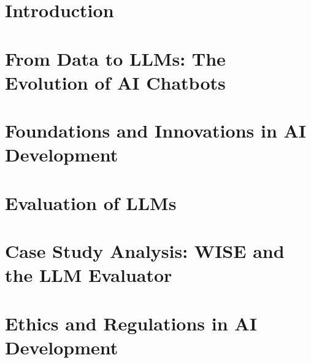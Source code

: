 \documentclass[a4paper,twoside]{book}
\begin{document}


\chapter{Introduction}


\chapter{From Data to LLMs: The Evolution of AI Chatbots}


\chapter{Foundations and Innovations in AI Development}


\chapter{Evaluation of LLMs}


\chapter{Case Study Analysis: WISE and the LLM Evaluator}


\chapter{Ethics and Regulations in AI Development}



\end{document}
